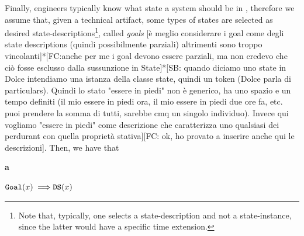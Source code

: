 \documentclass[sw]{iosart2x}
\newcommand{\bflist}{\begin{list}{}{\setlength{\topsep}{2mm}\setlength{\partopsep}{0mm}\setlength{\parsep}{0mm}\setlength{\leftmargin}{9mm}\setlength{\labelwidth}{8mm}}}
\newcommand{\eflist}{\end{list}}
\newcommand{\AxLabel}{\textrm{a}}
\newcounter{cntax}
\newcommand{\myax}[1]{\refstepcounter{cntax}\begin{small}{\bf \AxLabel\thecntax\label{ax:#1}}\end{small}}
\newcommand{\generalStyle}[1]{\texttt{#1}}
\newcommand{\uniRel}[2]{\generalStyle{#1}(#2)}
\newcommand{\myfi}{\hspace{0.9mm} \Longrightarrow}
\newcommand{\DOLCEDescription}[1]{\uniRel{{DS}}{#1}}
\newcommand{\DOLCEStative}[1]{\uniRel{{STV}}{#1}}
\newcommand{\Goal}[1]{\uniRel{Goal}{#1}}
\newcommand{\firstTimeKeyWord}[1]{\textit{#1}}
\newcommand{\stateVarCond}[1]{%
  \ifthenelse{\equal{#1}{fullSingular}}{system condition}{%
    \ifthenelse{\equal{#1}{shortSingular}}{condition}{%
      \ifthenelse{\equal{#1}{fullPlural}}{system conditions}{%
        \ifthenelse{\equal{#1}{shortPlural}}{conditions}{%
          ERROR!%
        }%
      }%
    }%
  }%
}
\newcommand{\TODO}[1]{{\color{red} #1}}
\begin{document}
Finally, engineers typically know what state a system should be in%
, therefore we assume that, given a technical artifact, some types of states are selected as desired state-descriptions\footnote{Note that, typically, one selects a state-description and not a state-instance, since the latter would have a specific time extension.}, called \firstTimeKeyWord{goals}\TODO{[è meglio considerare i goal come degli state descriptions (quindi possibilmente parziali) altrimenti sono troppo vincolanti]*[FC:anche per me i goal devono essere parziali, ma non credevo che ciò fosse esclusso dalla sussunzione in State]*[SB: quando diciamo uno state in Dolce intendiamo una istanza della classe state, quindi un token (Dolce parla di particulars). Quindi lo stato "essere in piedi" non è generico, ha uno spazio e un tempo definiti (il mio essere in piedi ora, il mio essere in piedi due ore fa, etc. puoi prendere la somma di tutti, sarebbe cmq un singolo individuo). Invece qui vogliamo "essere in piedi" come descrizione che caratterizza uno qualsiasi dei perdurant con quella proprietà stativa][FC: ok, ho provato a inserire anche qui le descrizioni]}. 
Then, we have that
\bflist
  \item[\myax{goalSubsum}] $ \Goal{x} \myfi \DOLCEDescription{x} $
\eflist


\end{document}
